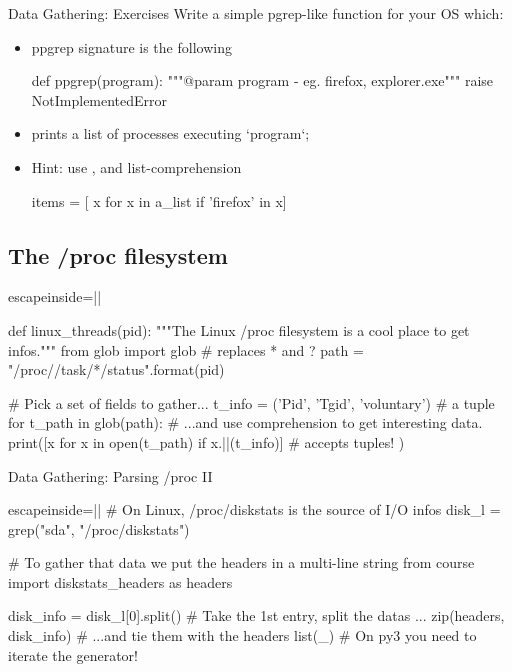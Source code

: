 \begin{pyframe}{Data Gathering: Exercises}
Write a simple pgrep-like function for your OS which:
\begin{itemize}
\item ppgrep signature is the following
\begin{pycode}
def ppgrep(program):
    """@param program - eg. firefox, explorer.exe"""
    raise NotImplementedError
\end{pycode}
\item prints a list of processes executing `program`;
\item Hint: use , and list-comprehension
\begin{pycode}
items = [ x for x in a_list if 'firefox' in x]
\end{pycode}
\end{itemize}
\end{pyframe}


\subsection{The /proc filesystem}
\begin{pyframe}{}
\begin{pycode*}{escapeinside=||}

def linux_threads(pid):
  """The Linux /proc filesystem is a cool place to get infos."""
  from glob import glob  # replaces * and ?
  path = "/proc/{}/task/*/status".format(pid)
  
  # Pick a set of fields to gather...
  t_info = ('Pid', 'Tgid', 'voluntary') # a tuple
  for t_path in glob(path):
    # ...and use comprehension to get interesting data.
    print([x for x in open(t_path) 
        if x.||(t_info)] #  accepts tuples!
    )
\end{pycode*}
\end{pyframe}



\begin{pyframe}{Data Gathering: Parsing /proc II}
\begin{pycode*}{escapeinside=||}
# On Linux, /proc/diskstats is the source of I/O infos
disk_l = grep("sda", "/proc/diskstats")

# To gather that data we put the headers in a multi-line string
from course import diskstats_headers as headers
        
disk_info = disk_l[0].split() # Take the 1st entry, split the datas ...
zip(headers, disk_info)          # ...and tie them with the headers
list(_) # On py3 you need to iterate the generator!
\end{pycode*}
\end{pyframe}

